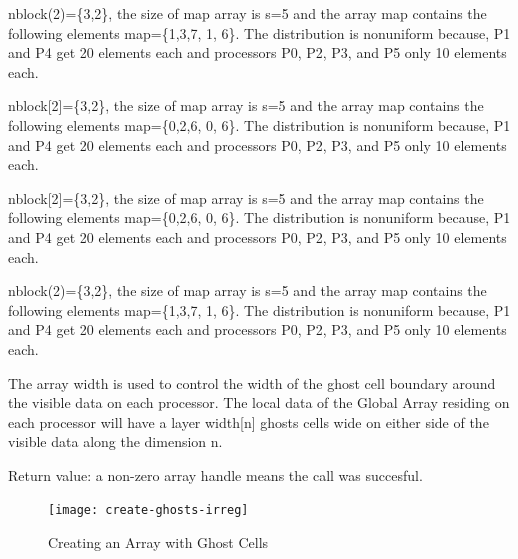 \documentclass[12pt]{article}
\begin{document}
\begin{fdesc}
nblock(2)=\{3,2\}, the size of map array is s=5 and the array map contains the
following elements map=\{1,3,7, 1, 6\}. The distribution is nonuniform because,
P1 and P4 get 20 elements each and processors P0, P2, P3, and P5 only 10
elements each.
\end{fdesc}

\begin{cdesc}
nblock[2]=\{3,2\}, the size of map array is s=5 and the array map contains the
following elements map=\{0,2,6, 0, 6\}. The distribution is nonuniform because,
P1 and P4 get 20 elements each and processors P0, P2, P3, and P5 only 10
elements each.
\end{cdesc}

\begin{cxxdesc}
nblock[2]=\{3,2\}, the size of map array is s=5 and the array map contains the
following elements map=\{0,2,6, 0, 6\}. The distribution is nonuniform because,
P1 and P4 get 20 elements each and processors P0, P2, P3, and P5 only 10
elements each.
\end{cxxdesc}

\begin{pydesc}
nblock(2)=\{3,2\}, the size of map array is s=5 and the array map contains the
following elements map=\{1,3,7, 1, 6\}. The distribution is nonuniform because,
P1 and P4 get 20 elements each and processors P0, P2, P3, and P5 only 10
elements each.
\end{pydesc}

\begin{desc}
The array width is used to control the width of the ghost cell boundary
around the visible data on each processor. The local data of the Global Array
residing on each processor will have a layer width[n] ghosts cells wide on
either side of the visible data along the dimension n.

Return value: a non-zero array handle means the call was succesful.

\begin{figure}
\texttt{[image: create-ghosts-irreg]}
\centering
\caption{Creating an Array with Ghost Cells}
\label{crghostir}
\end{figure}

\end{desc}


\end{document}
